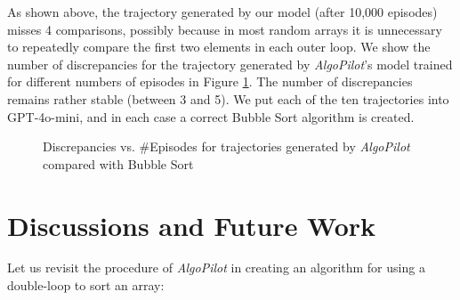 \documentclass[pdflatex,sn-mathphys-num]{sn-jnl}%
\theoremstyle{thmstyleone}%
\theoremstyle{thmstyletwo}%
\theoremstyle{thmstylethree}%
\begin{document}
As shown above, the trajectory generated by our model (after 10,000 episodes) misses 4 comparisons, possibly because in most random arrays it is unnecessary to repeatedly compare the first two elements in each outer loop. We show the number of discrepancies for the trajectory generated by \emph{AlgoPilot}'s model trained for different numbers of episodes in Figure \ref{fig:discrepancy}. The number of discrepancies remains rather stable (between 3 and 5). We put each of the ten trajectories into GPT-4o-mini, and in each case a correct Bubble Sort algorithm is created.

\begin{figure}[ht]
    \centering
    \caption{Discrepancies vs. \#Episodes for trajectories generated by \emph{AlgoPilot} compared with Bubble Sort}
    \label{fig:discrepancy}
\end{figure}



\section{Discussions and Future Work}

Let us revisit the procedure of \emph{AlgoPilot} in creating an algorithm for using a double-loop to sort an array:
\end{document}
